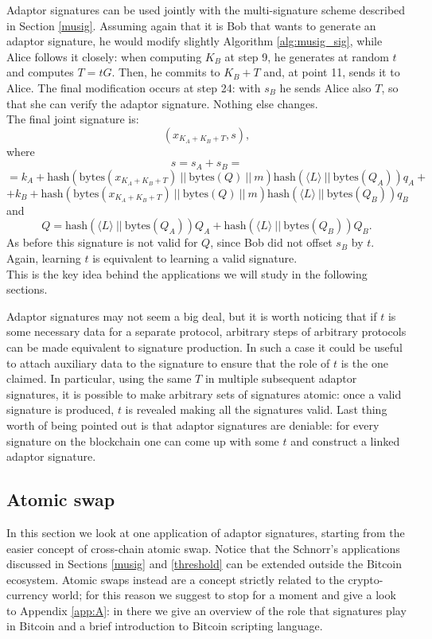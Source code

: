 \bigskip
\noindent
Adaptor signatures can be used jointly with the multi-signature scheme described in Section \ref{musig}. Assuming again that it is Bob that wants to generate an adaptor signature, he would modify slightly Algorithm \ref{alg:musig_sig}, while Alice follows it closely: when computing $K_B$ at step 9, he generates at random $t$ and computes $T = tG$. Then, he commits to $K_B + T$ and, at point 11, sends it to Alice. The final modification occurs at step 24: with $s_B$ he sends Alice also $T$, so that she can verify the adaptor signature. Nothing else changes. 
\\
The final joint signature is: 
$$(x_{K_A + K_B + T}, s),$$
where
$$s = s_A + s_B = $$
$$= k_A + \text{hash}(\text{bytes}(x_{K_A + K_B + T}) \ || \ \text{bytes}(Q) \ || \ m)\text{hash}(\langle L \rangle \ || \ \text{bytes}(Q_A))q_A + $$
$$+ k_B + \text{hash}(\text{bytes}(x_{K_A + K_B + T}) \ || \ \text{bytes}(Q) \ || \ m)\text{hash}(\langle L \rangle \ || \ \text{bytes}(Q_B))q_B$$ 
and
$$Q =  \text{hash}(\langle L \rangle \ || \ \text{bytes}(Q_A))Q_A + \text{hash}(\langle L \rangle \ || \ \text{bytes}(Q_B))Q_B.$$ 
As before this signature is not valid for $Q$, since Bob did not offset $s_B$ by $t$. Again, learning $t$ is equivalent to learning a valid signature.
\\
This is the key idea behind the applications we will study in the following sections.

\bigskip
\noindent
Adaptor signatures may not seem a big deal, but it is worth noticing that if $t$ is some necessary data for a separate protocol, arbitrary steps of arbitrary protocols can be made equivalent to signature production. In such a case it could be useful to attach auxiliary data to the signature to ensure that the role of $t$ is the one claimed. In particular, using the same $T$ in multiple subsequent adaptor signatures, it is possible to make arbitrary sets of signatures atomic: once a valid signature is produced, $t$ is revealed making all the signatures valid. Last thing worth of being pointed out is that adaptor signatures are deniable: for every signature on the blockchain one can come up with some $t$ and construct a linked adaptor signature.

\bigskip

\subsection{Atomic swap}
\label{atomic}
In this section we look at one application of adaptor signatures, starting from the easier concept of cross-chain atomic swap. Notice that the Schnorr's applications discussed in Sections \ref{musig} and \ref{threshold} can be extended outside the Bitcoin ecosystem. Atomic swaps instead are a concept strictly related to the crypto-currency world; for this reason we suggest to stop for a moment and give a look to Appendix \ref{app:A}: in there we give an overview of the role that signatures play in Bitcoin and a brief introduction to Bitcoin scripting language.

